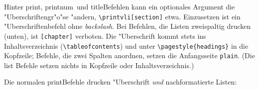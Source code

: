 \documentclass[12pt,a4paper]{article}
\begin{document}

\vspace{1.25ex}\noindent
Hinter print\fhy, printnum\hy\ und title\hy Befehlen kann ein 
optionales Argument die "Uberschriftengr"o"se "andern, 
\verb|\printvli[section]| etwa. Einzusetzen ist ein
"Uberschriftenbefehl ohne \textit{backslash}. Bei Befehlen, die
Listen zweispaltig drucken (unten), ist \verb|[chapter]| 
verboten. Die "Uberschrift kommt stets ins Inhaltsverzeichnis 
(\verb|\tableofcontents|) und unter \verb|\pagestyle{headings}| 
in die Kopfzeile; Befehle, die zwei Spalten anordnen, setzen 
die Anfangsseite \texttt{plain}. \hspace{.1em}(Die list\hy 
Befehle setzen nichts in Kopfzeile oder Inhaltsverzeichnis.)

\vspace{1ex}\noindent
Die normalen print\hy Befehle drucken "Uberschrift \hspace{-.1em}\textit{und} 
nachformatierte Listen:
\end{document}
